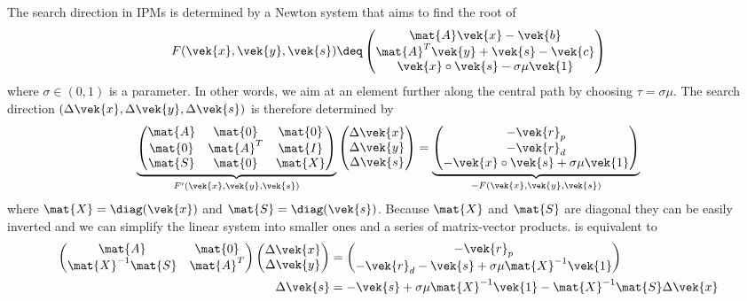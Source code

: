 The search direction in IPMs is determined by a Newton system that aims to find the root of 
\begin{equation}
  F(\vek{x}, \vek{y}, \vek{s}) \deq \begin{pmatrix} \mat{A}\vek{x} - \vek{b} \\ \mat{A}^T \vek{y} + \vek{s} - \vek{c} \\ \vek{x} \circ \vek{s} - \sigma \mu \vek{1} \end{pmatrix}
\end{equation}
where \(\sigma \in (0, 1)\) is a parameter.
In other words, we aim at an element further along the central path by choosing \(\tau = \sigma \mu\).
The search direction \((\Delta\vek{x}, \Delta\vek{y}, \Delta\vek{s})\) is therefore determined by 
\begin{equation}\label{eqn:newton-system}
  \underbrace{
  \begin{pmatrix}
    \mat{A} & \mat{0}   & \mat{0} \\
    \mat{0} & \mat{A}^T & \mat{I} \\
    \mat{S} & \mat{0}   & \mat{X} \\
  \end{pmatrix}
  }_{F'(\vek{x}, \vek{y}, \vek{s})}
  \begin{pmatrix} \Delta\vek{x} \\ \Delta\vek{y} \\ \Delta\vek{s} \end{pmatrix}
  =
  \underbrace{
  \begin{pmatrix} -\vek{r}_p \\ -\vek{r}_d \\ - \vek{x} \circ \vek{s} + \sigma \mu \vek{1} \end{pmatrix}
  }_{-F(\vek{x}, \vek{y}, \vek{s})}
\end{equation}
where \(\mat{X} = \diag(\vek{x})\) and \(\mat{S} = \diag(\vek{s})\).
Because \(\mat{X}\) and \(\mat{S}\) are diagonal they can be easily inverted and we can simplify the linear system into smaller ones and a series of matrix-vector products.
 is equivalent to 
\begin{subequations}\label{eqn:augmented-system}
  \begin{align}
    \begin{pmatrix}
      \mat{A}              & \mat{0} \\
      \mat{X}^{-1} \mat{S} & \mat{A}^T \\
    \end{pmatrix}
    \begin{pmatrix}
      \Delta\vek{x} \\
      \Delta\vek{y}
    \end{pmatrix}
    &=
    \begin{pmatrix}
      -\vek{r}_p \\
      -\vek{r}_d -\vek{s} + \sigma \mu \mat{X}^{-1} \vek{1}
    \end{pmatrix} \\
    \Delta\vek{s} &= -\vek{s} + \sigma \mu \mat{X}^{-1} \vek{1} - \mat{X}^{-1} \mat{S} \Delta\vek{x}
  \end{align}
\end{subequations}

